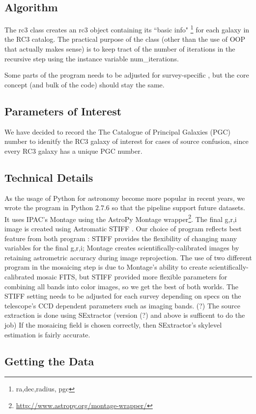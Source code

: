 \documentclass[5p]{elsarticle}
\begin{document}
	\subsection{Algorithm}
	The rc3 class creates an rc3 object containing its ``basic info" \footnote{ ra,dec,radius, pgc} for each galaxy in the RC3 catalog. The practical purpose of the class (other than the use of OOP that actually makes sense) is to keep tract of the number of iterations in the recursive step using the instance variable num\_iterations. 

	Some parts of the program needs to be adjusted for survey-specific , but the core concept (and bulk of the code) should stay the same. 
		\subsection{Parameters of Interest }
	We have decided to record the The Catalogue of Principal Galaxies (PGC) number to idenitfy the RC3 galaxy of interest for cases of source confusion, since every RC3 galaxy has a unique PGC number. 

		\subsection{Technical Details}
		As the usage of Python for astronomy become more popular in recent years, we wrote the program in Python 2.7.6 so that the pipeline support future datasets.	 It uses IPAC's Montage  \cite{montage} using the AstroPy Montage wrapper\footnote{\url{http://www.astropy.org/montage-wrapper/}}.  The final g,r,i image is created using Astromatic STIFF \cite{stiff} . Our choice of program reflects best feature from both program : STIFF provides the flexibility of changing many variables for the final g,r,i; Montage creates scientifically-calibrated images by retaining astrometric accuracy during image reprojection. The use of two different program in the mosaicing step is due to Montage's ability to create scientifically-calibrated mosaic FITS, but STIFF provided more flexible parameters for combining all bands into color images, so we get the best of both worlds. The STIFF setting needs to be adjusted for each survey depending on specs on the telescope's CCD dependent parameters such as imaging bands. (?) The source extraction is done using SExtractor (version (?) and above is sufficent to do the job) If the mosaicing field is chosen correctly, then SExtractor's skylevel estimation is fairly accurate. 
	\subsection{Getting the Data}
\end{document}
